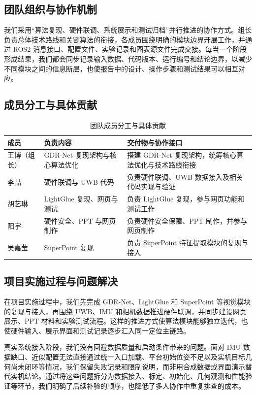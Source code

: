 \documentclass[UTF8,a4paper,12pt]{ctexart}
\begin{document}
\subsection{团队组织与协作机制}
我们采用“算法复现、硬件联调、系统展示和测试归档”并行推进的协作方式。组长负责总体技术路线和关键算法的衔接，各成员围绕明确的模块边界开展工作，并通过 ROS2 消息接口、配置文件、实验记录和图表源文件完成交接。每当一个阶段形成结果，我们都会同步记录输入数据、代码版本、运行编号和结论边界，以减少不同模块之间的信息断层，也使报告中的设计、操作步骤和测试结果可以相互对应。

\subsection{成员分工与具体贡献}

\begin{table}[htbp]
  \centering
  \small
  \caption{团队成员分工与具体贡献}\label{tab:team-division}
  \begin{tabular}{p{2.3cm}p{3.0cm}p{6.1cm}}
    \toprule
    成员 & 负责内容 & 交付物与协作接口 \\
    \midrule
    王博（组长） & GDR-Net 复现架构与核心算法优化 & 搭建 GDR-Net 复现架构，统筹核心算法优化与技术路线衔接 \\
    李喆 & 硬件联调与 UWB 代码 & 负责硬件联调、UWB 数据接入及相关代码实现与验证 \\
    胡艺琳 & LightGlue 复现、网页与测试 & 负责 LightGlue 复现，参与网页功能和测试工作 \\
    阳宇 & 硬件安全、PPT 与网页制作 & 负责硬件安全保障、PPT 制作，并参与网页制作 \\
    吴嘉莹 & SuperPoint 复现 & 负责 SuperPoint 特征提取模块的复现与接入 \\
    \bottomrule
  \end{tabular}
\end{table}

\subsection{项目实施过程与问题解决}
在项目实施过程中，我们先完成 GDR-Net、LightGlue 和 SuperPoint 等视觉模块的复现与接入，再围绕 UWB、IMU 和相机数据推进硬件联调，并同步建设网页展示、PPT 材料和实验测试流程。这样的推进方式使算法模块能够独立迭代，也使硬件输入、展示界面和测试记录逐步汇入同一定位主链路。

真实系统接入阶段，我们没有回避数据质量和启动条件带来的问题。面对 IMU 数据缺口、近似配置无法直接通过统一入口加载、平台初始位姿不足以及实机目标几何尚未闭环等情况，我们保留失败记录和限制说明，而非用合成数据或界面演示替代实机结论。通过将这些问题拆分为数据接入、标定、初始化、几何观测和性能验证等环节，我们明确了后续补验的顺序，也降低了多人协作中重复排查的成本。
\end{document}
